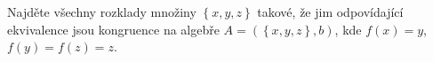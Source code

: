 \subsubsection{}
Najděte všechny rozklady množiny $\left \{ x,y,z \right \}$ takové, že jim
odpovídající ekvivalence jsou kongruence na algebře $A=\left (  \left \{ x,y,z
\right \},b\right )$, kde $f(x)=y$, $f(y)=f(z)=z$.
